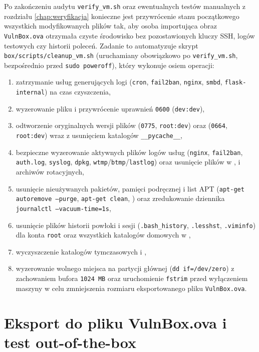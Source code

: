 Po zakończeniu audytu \texttt{verify\_vm.sh} oraz ewentualnych testów manualnych z rozdziału \ref{chap:weryfikacja} konieczne jest przywrócenie stanu początkowego wszystkich modyfikowanych plików tak, aby osoba importująca obraz \texttt{VulnBox.ova} otrzymała czyste środowisko bez pozostawionych kluczy SSH, logów testowych czy historii poleceń. Zadanie to automatyzuje skrypt \texttt{box/scripts/cleanup\_vm.sh} (uruchamiany obowiązkowo po \texttt{verify\_vm.sh}, bezpośrednio przed \texttt{sudo poweroff}), który wykonuje osiem operacji:
\begin{enumerate}
    \item zatrzymanie usług generujących logi (\texttt{cron}, \texttt{fail2ban}, \texttt{nginx}, \texttt{smbd}, \texttt{flask-internal}) na czas czyszczenia,
    \item wyzerowanie pliku  i przywrócenie uprawnień \texttt{0600} (\texttt{dev:dev}),
    \item odtworzenie oryginalnych wersji plików  (\texttt{0775}, \texttt{root:dev}) oraz  (\texttt{0664}, \texttt{root:dev}) wraz z usunięciem katalogów \texttt{\_\_pycache\_\_},
    \item bezpieczne wyzerowanie aktywnych plików logów usług (\texttt{nginx}, \texttt{fail2ban}, \texttt{auth.log}, \texttt{syslog}, \texttt{dpkg}, \texttt{wtmp}/\texttt{btmp}/\texttt{lastlog}) oraz usunięcie plików w ,  i archiwów rotacyjnych,
    \item usunięcie nieużywanych pakietów, pamięci podręcznej i list APT (\texttt{apt-get autoremove --purge}, \texttt{apt-get clean}, ) oraz zredukowanie dziennika \texttt{journalctl --vacuum-time=1s},
    \item usunięcie plików historii powłoki i sesji (\texttt{.bash\_history}, \texttt{.lesshst}, \texttt{.viminfo}) dla konta \texttt{root} oraz wszystkich katalogów domowych w ,
    \item wyczyszczenie katalogów tymczasowych  i ,
    \item wyzerowanie wolnego miejsca na partycji głównej (\texttt{dd if=/dev/zero}) z zachowaniem bufora \texttt{1024 MB} oraz uruchomienie \texttt{fstrim} przed wyłączeniem maszyny w celu zmniejszenia rozmiaru eksportowanego pliku \texttt{VulnBox.ova}.
\end{enumerate}

\section{Eksport do pliku VulnBox.ova i test out-of-the-box}
\label{sec:eksport-ova}

